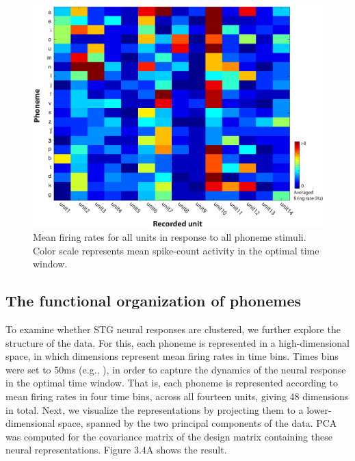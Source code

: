 \begin{figure}[h]
\vspace{.3in}
\includegraphics[width=\linewidth]{Figures/Ch3/Figure3_new.eps}
\caption{Mean firing rates for all units in response to all phoneme stimuli. Color scale represents mean spike-count activity in the optimal time window.}
\end{figure}

\subsection{The functional organization of phonemes}
To examine whether STG neural responses are clustered, we further explore the structure of the data. For this, each phoneme is represented in a high-dimensional space, in which dimensions represent mean firing rates in time bins. Times bins were set to 50ms (e.g., \citealp{chan2013speech, Mesgarani2014}), in order to capture the dynamics of the neural response in the optimal time window. That is, each phoneme is represented according to mean firing rates in four time bins, across all fourteen units, giving 48 dimensions in total. Next, we visualize the representations by projecting them to a lower-dimensional space, spanned by the two principal components of the data. PCA was computed for the covariance matrix of the design matrix containing these neural representations. Figure 3.4A shows the result.

